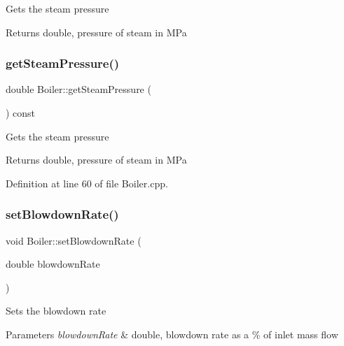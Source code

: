 Gets the steam pressure \begin{DoxyReturn}{Returns}
double, pressure of steam in M\+Pa 
\end{DoxyReturn}
\mbox{\label{class_boiler_a99d4bbace6ef20bcbdc4b0cfcdc43213}} 
\subsubsection{\texorpdfstring{get\+Steam\+Pressure()}{getSteamPressure()}\hspace{0.1cm}{\footnotesize\ttfamily [3/3]}}
{\footnotesize\ttfamily double Boiler\+::get\+Steam\+Pressure (\begin{DoxyParamCaption}{ }\end{DoxyParamCaption}) const}

Gets the steam pressure \begin{DoxyReturn}{Returns}
double, pressure of steam in M\+Pa 
\end{DoxyReturn}


Definition at line 60 of file Boiler.\+cpp.

\mbox{\label{class_boiler_a66c0e4c577dbd3f52dcf202e69a08371}} 
\subsubsection{\texorpdfstring{set\+Blowdown\+Rate()}{setBlowdownRate()}\hspace{0.1cm}{\footnotesize\ttfamily [1/3]}}
{\footnotesize\ttfamily void Boiler\+::set\+Blowdown\+Rate (\begin{DoxyParamCaption}\item[{double}]{blowdown\+Rate }\end{DoxyParamCaption})}

Sets the blowdown rate 
\begin{DoxyParams}{Parameters}
{\em blowdown\+Rate} & double, blowdown rate as a \% of inlet mass flow \\
\hline
\end{DoxyParams}
\mbox{\label{class_boiler_a66c0e4c577dbd3f52dcf202e69a08371}} 
